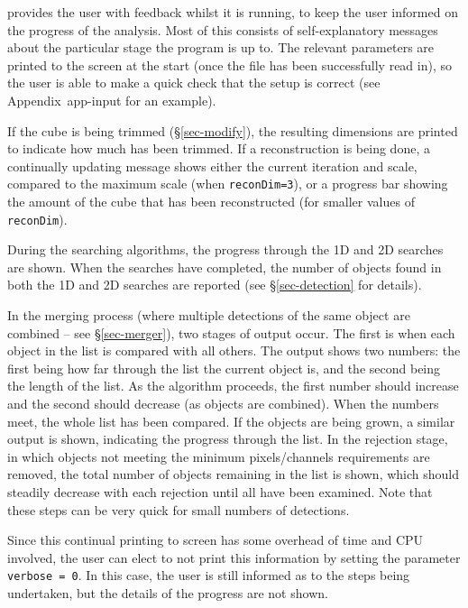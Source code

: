 \label{sec-output}


\duchamp provides the user with feedback whilst it is running, to
keep the user informed on the progress of the analysis. Most of this
consists of self-explanatory messages about the particular stage the
program is up to. The relevant parameters are printed to the screen at
the start (once the file has been successfully read in), so the user
is able to make a quick check that the setup is correct (see
Appendix~{app-input} for an example).

If the cube is being trimmed (\S\ref{sec-modify}), the resulting
dimensions are printed to indicate how much has been trimmed. If a
reconstruction is being done, a continually updating message shows
either the current iteration and scale, compared to the maximum scale
(when \texttt{reconDim=3}), or a progress bar showing the amount of
the cube that has been reconstructed (for smaller values of
\texttt{reconDim}).

During the searching algorithms, the progress through the 1D and 2D
searches are shown. When the searches have completed, the number of
objects found in both the 1D and 2D searches are reported (see
\S\ref{sec-detection} for details).

In the merging process (where multiple detections of the same object
are combined -- see \S\ref{sec-merger}), two stages of output
occur. The first is when each object in the list is compared with all
others. The output shows two numbers: the first being how far through
the list the current object is, and the second being the length of the
list. As the algorithm proceeds, the first number should increase and
the second should decrease (as objects are combined). When the numbers
meet, the whole list has been compared. If the objects are being
grown, a similar output is shown, indicating the progress through the
list. In the rejection stage, in which objects not meeting the minimum
pixels/channels requirements are removed, the total number of objects
remaining in the list is shown, which should steadily decrease with
each rejection until all have been examined. Note that these steps can
be very quick for small numbers of detections.

Since this continual printing to screen has some overhead of time and
CPU involved, the user can elect to not print this information by
setting the parameter \texttt{verbose = 0}. In this case, the user is
still informed as to the steps being undertaken, but the details of
the progress are not shown.

